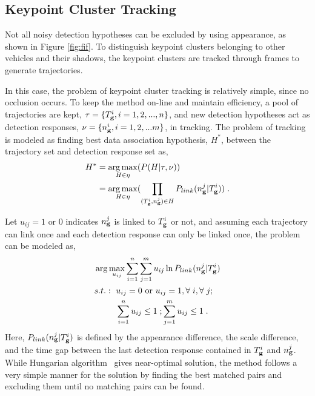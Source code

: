 \subsection{Keypoint Cluster Tracking}
Not all noisy detection hypotheses can be excluded by using appearance, as shown in Figure \ref{fig:fif}. To distinguish keypoint clusters belonging to other vehicles and their shadows, the keypoint clusters are tracked through frames to generate trajectories.

In this case, the problem of keypoint cluster tracking  is relatively simple, since no occlusion occurs. To keep the method on-line and maintain efficiency, a pool of trajectories are kept, $\tau=\{T_{\bf{g}}^i,i=1,2,...,n\}$, and new detection hypotheses act as detection responses, $\nu=\{n_{\bf{g}}^i,i=1,2,...m\}$, in tracking. The problem of tracking is modeled as finding best data association hypothesis, $H^*$, between the trajectory set and detection response set as,
\begin{equation}
\begin{aligned}
{H^*} &= \mathop {\arg \max }\limits_{H \in \eta
} (P(H|\tau,\nu )) \\
&= \mathop {\arg \max }\limits_{H \in \eta }
(\prod\limits_{(T_{\bf{g}}^i,n_{\bf{g}}^j) \in H} {P_{link}(n_{\bf{g}}^j|T_{\bf{g}}^i)} ) \;.
\end{aligned}
\label{eq3}
\end{equation}

Let $u_{ij}=1 \mbox{ or } 0$ indicates $n_{\bf{g}}^j$ is linked to $T_{\bf{g}}^i$ or not, and assuming each trajectory can link once and each detection response can only be linked once, the problem can be modeled as,
\[
\begin{aligned}
&\arg \max\limits_{u_{ij}} \sum\limits_{i = 1}^n \sum\limits_{j = 1}^m u_{ij} \ln P_{link}(n_{\bf{g}}^j|T_{\bf{g}}^i)\\
&
\begin{aligned}
    s.t.:\mbox{ }&u_{ij}=0\mbox{ or }u_{ij}=1,\forall\;i,\forall\;j;\\
    &\sum\limits_{i = 1}^n {u_{ij}} \leq 1\;; \sum\limits_{j = 1}^m {u_{ij}}\leq 1\;.
\end{aligned}
\end{aligned}
\]
Here, $P_{link}(n_{\bf{g}}^j|T_{\bf{g}}^i)$ is defined by the appearance difference, the scale difference, and the time gap between the last detection response contained in $T_{\bf{g}}^i$ and $n_{\bf{g}}^j$. While Hungarian algorithm~\citep{ha} gives near-optimal solution, the method follows a very simple manner for the solution by finding the best matched pairs and excluding them until no matching pairs can be found.

